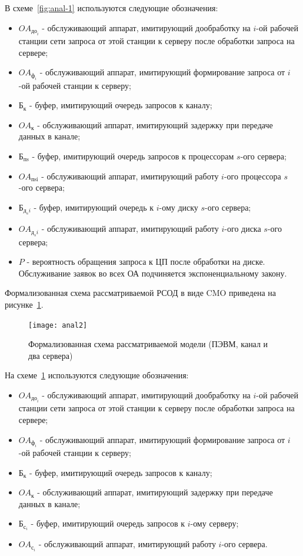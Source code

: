 \documentclass[russian,utf8,emptystyle]{eskdtext}
\begin{document}
В схеме~\ref{fig:anal-1} используются следующие обозначения:
\begin{itemize}[label=-]
\item $OA_{\text{до}_i}$ - обслуживающий аппарат, имитирующий дообработку на $i$-ой рабочей станции сети запроса от этой станции к серверу после обработки запроса на сервере;
\item $OA_{\text{ф}_i}$ - обслуживающий аппарат, имитирующий формирование запроса от $i$-ой рабочей станции к серверу;
\item $\text{Б}_\text{к}$ - буфер, имитирующий очередь запросов к каналу;
\item $OA_\text{к}$ - обслуживающий аппарат, имитирующий задержку при передаче данных в канале;
\item $\text{Б}_\text{пs}$ - буфер, имитирующий очередь запросов к процессорам $s$-ого сервера;
\item $OA_\text{пsi}$ - обслуживающий аппарат, имитирующий работу $i$-ого процессора $s$-ого сервера;
\item $\text{Б}_{\text{д}_si}$ - буфер, имитирующий очередь к $i$-ому диску $s$-ого сервера;
\item $OA_{\text{д}_si}$ - обслуживающий аппарат, имитирующий работу $i$-ого диска $s$-ого сервера;
\item $P$ - вероятность обращения запроса к ЦП после обработки на диске. Обслуживание заявок во всех ОА подчиняется экспоненциальному закону.
\end{itemize}

Формализованная схема рассматриваемой РСОД в виде CMO приведена на рисунке~\ref{fig:anal-2}.
\begin{figure}[h!]
\centering
\texttt{[image: anal2]}
\caption{Формализованная схема рассматриваемой модели (ПЭВМ, канал и два сервера)}
\label{fig:anal-2}
\end{figure}

На схеме~\ref{fig:anal-2} используются следующие обозначения:
\begin{itemize}[label=-]
\item $OA_{\text{до}_i}$ - обслуживающий аппарат, имитирующий дообработку на $i$-ой рабочей станции сети запроса от этой станции к серверу после обработки запроса на сервере;
\item $OA_{\text{ф}_i}$ - обслуживающий аппарат, имитирующий формирование запроса от $i$-ой рабочей станции к серверу;
\item $\text{Б}_\text{к}$ - буфер, имитирующий очередь запросов к каналу;
\item $OA_\text{к}$ - обслуживающий аппарат, имитирующий задержку при передаче данных в канале;
\item $\text{Б}_{\text{с}_i}$ - буфер, имитирующий очередь запросов к $i$-ому серверу;
\item $OA_{\text{с}_i}$ - обслуживающий аппарат, имитирующий работу $i$-ого сервера.
\end{itemize}
\end{document}
